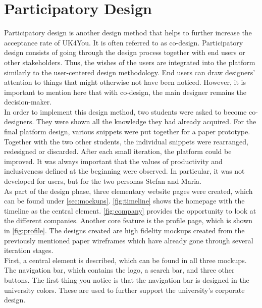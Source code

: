 \section{Participatory Design}
Participatory design is another design method that helps to further increase the acceptance rate of UK4You\cite{participatory-design-spinuzzi}.
It is often referred to as co-design.
Participatory design consists of going through the design process together with end users or other stakeholders.
Thus, the wishes of the users are integrated into the platform similarly to the user-centered design methodology.
End users can draw designers' attention to things that might otherwise not have been noticed.
However, it is important to mention here that with co-design, the main designer remains the decision-maker.\\

In order to implement this design method, two students were asked to become co-designers.
They were shown all the knowledge they had already acquired.
For the final platform design, various snippets were put together for a paper prototype.
Together with the two other students, the individual snippets were rearranged, redesigned or discarded.
After each small iteration, the platform could be improved.
It was always important that the values of productivity and inclusiveness defined at the beginning were observed.
In particular, it was not developed for users, but for the two personas Stefan and Maria.\\

As part of the design phase, three elementary website pages were created, which can be found under \autoref{sec:mockups}.
\autoref{fig:timeline} shows the homepage with the timeline as the central element.
\autoref{fig:company} provides the opportunity to look at the different companies.
Another core feature is the profile page, which is shown in \autoref{fig:profile}.
The designs created are high fidelity mockups created from the previously mentioned paper wireframes which have already gone through several iteration stages.\\

First, a central element is described, which can be found in all three mockups.
The navigation bar, which contains the logo, a search bar, and three other buttons.
The first thing you notice is that the navigation bar is designed in the university colors\cite{uni-kassel-colors}.
These are used to further support the university's corporate design.\\

